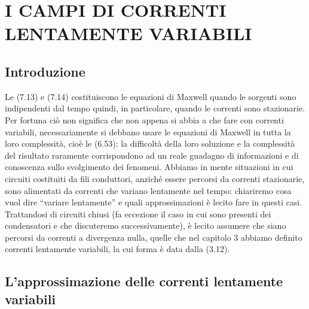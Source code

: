 \section{I CAMPI DI CORRENTI LENTAMENTE VARIABILI}

\subsection{Introduzione}

Le (7.13) e (7.14) costituiscono le equazioni di Maxwell quando le sorgenti sono
indipendenti dal tempo quindi, in particolare, quando le correnti sono
stazionarie. Per fortuna ci\`o non significa che non appena si abbia a che fare
con correnti variabili, necessariamente si debbano usare le equazioni di Maxwell
in tutta la loro complessit\`a, cio\`e le (6.53): la difficolt\`a della loro
soluzione e la complessit\`a del risultato raramente corrispondono ad un reale
guadagno di informazioni e di conoscenza sullo svolgimento dei fenomeni. Abbiamo
in mente situazioni in cui circuiti costituiti da fili conduttori, anzich\'e
essere percorsi da correnti stazionarie, sono alimentati da correnti che variano
lentamente nel tempo: chiariremo cosa vuol dire ``variare lentamente'' e quali
approssimazioni \`e lecito fare in questi casi. Trattandosi di circuiti chiusi
(fa eccezione il caso in cui sono presenti dei condensatori e che discuteremo
successivamente), \`e lecito assumere che siano percorsi da correnti a
divergenza nulla, quelle che nel capitolo 3 abbiamo definito correnti lentamente
variabili, la cui forma \`e data dalla (3.12).

\subsection{L'approssimazione delle correnti lentamente variabili}

